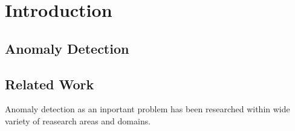 
\chapter{Introduction}

\section{Anomaly Detection}


\section{Related Work}

Anomaly detection as an inportant problem has been researched within wide variety of reasearch areas and domains.

